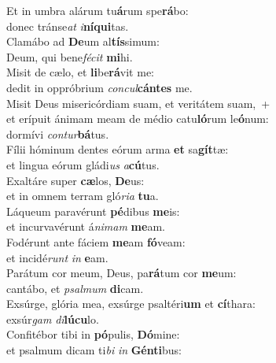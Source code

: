 \evenverse Et in umbra alárum tu\textbf{á}rum spe\textbf{rá}bo:~\*\\
\evenverse donec tránse\textit{at} \textit{i}\textbf{ní}\textbf{qui}tas.\\
\oddverse Clamábo ad \textbf{De}um al\textbf{tís}simum:~\*\\
\oddverse Deum, qui bene\textit{fé}\textit{cit} \textbf{mi}hi.\\
\evenverse Misit de cælo, et \textbf{li}be\textbf{rá}vit me:~\*\\
\evenverse dedit in oppróbrium \textit{con}\textit{cul}\textbf{cán}\textbf{tes} me.\\
\oddverse Misit Deus misericórdiam suam, et veritátem suam,~+\\
\oddverse  et erípuit ánimam meam de médio catu\textbf{ló}rum le\textbf{ó}num:~\*\\
\oddverse dormívi \textit{con}\textit{tur}\textbf{bá}tus.\\
\evenverse Fílii hóminum dentes eórum arma \textbf{et} sa\textbf{gít}tæ:~\*\\
\evenverse et lingua eórum gládi\textit{us} \textit{a}\textbf{cú}tus.\\
\oddverse Exaltáre super \textbf{cæ}los, \textbf{De}us:~\*\\
\oddverse et in omnem terram gló\textit{ri}\textit{a} \textbf{tu}a.\\
\evenverse Láqueum paravérunt \textbf{pé}dibus \textbf{me}is:~\*\\
\evenverse et incurvavérunt á\textit{ni}\textit{mam} \textbf{me}am.\\
\oddverse Fodérunt ante fáciem \textbf{me}am \textbf{fó}veam:~\*\\
\oddverse et incidé\textit{runt} \textit{in} \textbf{e}am.\\
\evenverse Parátum cor meum, Deus, pa\textbf{rá}tum cor \textbf{me}um:~\*\\
\evenverse cantábo, et \textit{psal}\textit{mum} \textbf{di}cam.\\
\oddverse Exsúrge, glória mea, exsúrge psaltéri\textbf{um} et \textbf{cí}thara:~\*\\
\oddverse exsúr\textit{gam} \textit{di}\textbf{lú}\textbf{cu}lo.\\
\evenverse Confitébor tibi in \textbf{pó}pulis, \textbf{Dó}mine:~\*\\
\evenverse et psalmum dicam ti\textit{bi} \textit{in} \textbf{Gén}\textbf{ti}bus:\\

